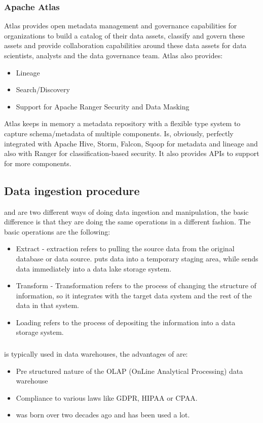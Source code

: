 \subsubsection{Apache Atlas}
Atlas provides open metadata management and governance capabilities for organizations to build a catalog of their data assets, classify and govern these assets and provide collaboration capabilities around these data assets for data scientists, analysts and the data governance team. \n
Atlas also provides:
\begin{itemize}
    \item Lineage
    \item Search/Discovery
    \item Support for Apache Ranger Security and Data Masking
\end{itemize}
Atlas keeps in memory a metadata repository with a flexible type system to capture schema/metadata of multiple components. \n
Is, obviously, perfectly integrated with Apache Hive, Storm, Falcon, Sqoop for metadata and lineage and also with Ranger for classification-based security. \n
It also provides APIs to support for more components. \n
\subsection{Data ingestion procedure}
\etl and \elt are two different ways of doing data ingestion and manipulation, the basic difference is that they are doing the same operations in a different fashion. \n
The basic operations are the following:
\begin{itemize}
    \item Extract - extraction refers to pulling the source data from the original database or data source. \etl puts data into a temporary staging area, while \elt sends data immediately into a data lake storage system.
    \item Transform - Transformation refers to the process of changing the structure of information, so it integrates with the target data system and the rest of the data in that system.
    \item Loading refers to the process of depositing the information into a data storage system.
\end{itemize}
\subsubsection{\etl}
\etl is typically used in data warehouses, the advantages of \etl are:
\begin{itemize}
    \item Pre structured nature of the OLAP (OnLine Analytical Processing) data warehouse
    \item Compliance to various laws like GDPR, HIPAA or CPAA.
    \item \etl was born over two decades ago and has been used a lot.
\end{itemize}

